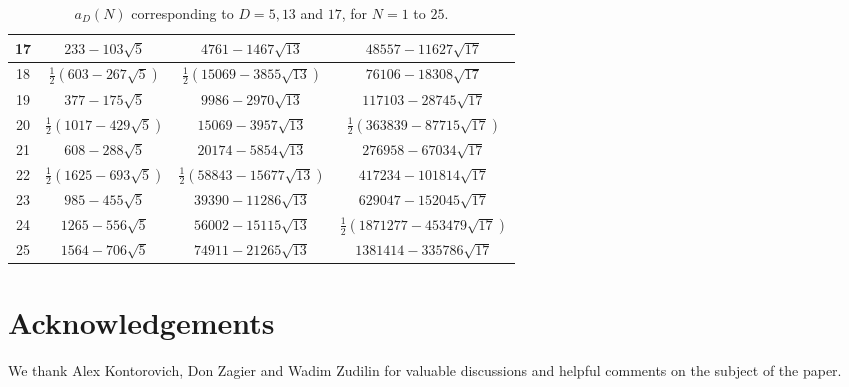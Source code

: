 \documentclass[11pt]{amsart}
\numberwithin{equation}{section}
\theoremstyle{remark}
\begin{document}
\begin{table}[ht]
\begin{tabular}{|c|c|c|c|}
\hline
17 & \( 233 - 103\sqrt{5} \) & \( 4761 - 1467\sqrt{13} \) & \( 48557 - 11627\sqrt{17} \) \\
\hline
18 & \( \frac{1}{2}(603 - 267\sqrt{5}) \) & \( \frac{1}{2}(15069 - 3855\sqrt{13}) \) & \( 76106 - 18308\sqrt{17} \) \\
\hline
19 & \( 377 - 175\sqrt{5} \) & \( 9986 - 2970\sqrt{13} \) & \( 117103 - 28745\sqrt{17} \) \\
\hline
20 & \( \frac{1}{2}(1017 - 429\sqrt{5}) \) & \( 15069 - 3957\sqrt{13} \) & \( \frac{1}{2}(363839 - 87715\sqrt{17}) \) \\
\hline
21 & \( 608 - 288\sqrt{5} \) & \( 20174 - 5854\sqrt{13} \) & \( 276958 - 67034\sqrt{17} \) \\
\hline
22 & \( \frac{1}{2}(1625 - 693\sqrt{5}) \) & \( \frac{1}{2}(58843 - 15677\sqrt{13}) \) & \( 417234 - 101814\sqrt{17} \) \\
\hline
23 & \( 985 - 455\sqrt{5} \) & \( 39390 - 11286\sqrt{13} \) & \( 629047 - 152045\sqrt{17} \) \\
\hline
24 & \( 1265 - 556\sqrt{5} \) & \( 56002 - 15115\sqrt{13} \) & \( \frac{1}{2}(1871277 - 453479\sqrt{17}) \) \\
\hline
25 & \( 1564 - 706\sqrt{5} \) & \( 74911 - 21265\sqrt{13} \) & \( 1381414 - 335786\sqrt{17} \) \\
\hline
\end{tabular}
\vspace{0.2cm}
\caption{$a_{D}(N)$ corresponding to $D=5,13$ and $17$, for \( N = 1 \) to \( 25 \).}

\label{tab:coefficients-5-13-17}
\end{table}


\FloatBarrier
\section{Acknowledgements}
We thank Alex Kontorovich, Don Zagier and Wadim Zudilin for valuable discussions and helpful comments on the subject of the paper.
\printbibliography
\end{document}
